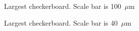 \begin{figure}[htb]
    \begin{subfigure}[t]{0.24\linewidth}
    	\centering
    	\caption{Largest checkerboard. Scale bar is 100~$\mu$m}
    	\label{fig:b2d26_q26}
    \end{subfigure}
    \hfill
    \begin{subfigure}[t]{0.24\linewidth}
    	\centering
    	\caption{Largest checkerboard. Scale bar is 40~$\mu$m}
    	\label{fig:b2d27_q27}
    \end{subfigure}
    \hfill
    \begin{subfigure}[t]{0.24\linewidth}

\end{subfigure}
\end{figure}
